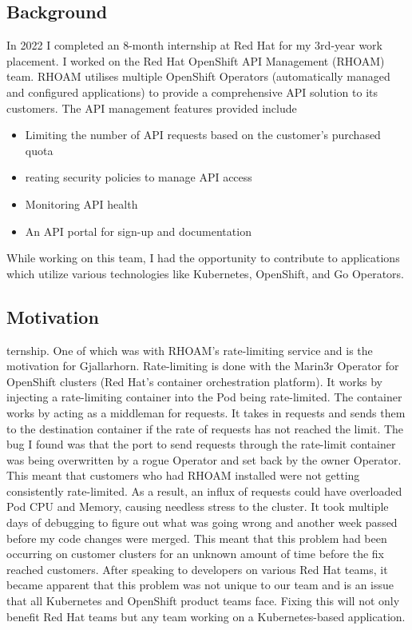 \documentclass{article}
\begin{document}
\subsection{Background}
In 2022 I completed an 8-month internship at Red Hat for my 3rd-year work placement. I worked on the Red Hat OpenShift API Management (RHOAM) team. RHOAM utilises multiple OpenShift Operators (automatically managed and configured applications) to provide a comprehensive API solution to its customers. The API management features provided include
\begin{itemize}
    \item Limiting the number of API requests based on the customer’s purchased quota
    \item reating security policies to manage API access
    \item Monitoring API health
    \item An API portal for sign-up and documentation
\end{itemize}
While working on this team, I had the opportunity to contribute to applications which utilize various technologies like Kubernetes, OpenShift, and Go Operators.


\subsection{Motivation}
ternship. One of which was with RHOAM’s rate-limiting service and is the motivation for Gjallarhorn. Rate-limiting is done with the Marin3r Operator for OpenShift clusters (Red Hat’s container orchestration platform). It works by injecting a rate-limiting container into the Pod being rate-limited. The container works by acting as a middleman for requests. It  takes in requests and sends them to the destination container if the rate of requests has not reached the limit. The bug I found was that the port to send requests through the rate-limit container was being overwritten by a rogue Operator and set back by the owner Operator. This meant that customers who had RHOAM installed were not getting consistently rate-limited. As a result, an influx of requests could have overloaded Pod CPU and Memory, causing needless stress to the cluster.
It took multiple days of debugging to figure out what was going wrong and another week passed before my code changes were merged. This meant that this problem had been occurring on customer clusters for an unknown amount of time before the fix reached customers. After speaking to developers on various Red Hat teams, it became apparent that this problem was not unique to our team and is an issue that all Kubernetes and OpenShift product teams face. Fixing this will not only benefit Red Hat teams but any team working on a Kubernetes-based application.
\end{document}

